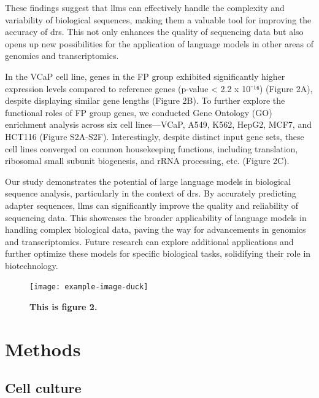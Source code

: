 \documentclass[pdflatex, sn-mathphys-num, lineno]{sn-jnl}%
\theoremstyle{thmstyleone}%
\theoremstyle{thmstyletwo}%
\theoremstyle{thmstylethree}%
\begin{document}
These findings suggest that \glspl{llm} can effectively handle the complexity and variability of biological sequences, making them a valuable tool for improving the accuracy of \gls{drs}.
This not only enhances the quality of sequencing data but also opens up new possibilities for the application of language models in other areas of genomics and transcriptomics.


In the VCaP cell line, genes in the FP group exhibited significantly higher expression levels compared to reference genes (p-value < 2.2 x 10⁻¹⁶) (Figure 2A), despite displaying similar gene lengths (Figure 2B). To further explore the functional roles of FP group genes, we conducted Gene Ontology (GO) enrichment analysis across six cell lines—VCaP, A549, K562, HepG2, MCF7, and HCT116 (Figure S2A-S2F). Interestingly, despite distinct input gene sets, these cell lines converged on common housekeeping functions, including translation, ribosomal small subunit biogenesis, and rRNA processing, etc. (Figure 2C).


Our study demonstrates the potential of large language models in biological sequence analysis, particularly in the context of \gls{drs}.
By accurately predicting adapter sequences,  \glspl{llm} can significantly improve the quality and reliability of sequencing data.
This showcases the broader applicability of language models in handling complex biological data, paving the way for advancements in genomics and transcriptomics.
Future research can explore additional applications and further optimize these models for specific biological tasks, solidifying their role in biotechnology.

\begin{figure}[!h]
	\texttt{[image: example-image-duck]}
	\caption{\bf This is figure 2.}
	\label{fig:f2}
\end{figure}

\section{Methods}\label{sec:methods}

\subsection{Cell culture}
\end{document}
